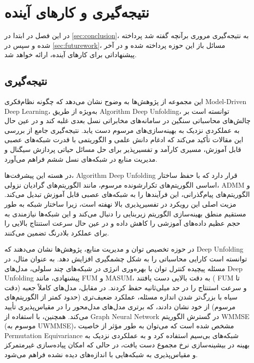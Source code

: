 \chapter{نتیجه‌گیری و کا‌ر‌های آینده}
\label{chap:conclusion}


در این فصل در ابتدا در 
\autoref{sec:conclusion}،
به نتیجه‌گیری مروری برآنچه گفته شد پرداخته شده و سپس در
\autoref{sec:futurework}،
مسائل باز این حوزه پرداخته شده و در آخر پیشنهاداتی برای کارهای آینده، ارائه خواهد شد. 

\section{نتیجه‌گیری}
\label{sec:conclusion}
این مجموعه از پژوهش‌ها به وضوح نشان می‌دهد که چگونه نظام‌فکری 
\gls{Model-Driven Deep Learning}،
به‌ویژه از طریق 
\gls{Algorithm Deep Unfolding}،
 توانسته است بر چالش‌های محاسباتی سنگین در سامانه‌های مخابراتی نسل بعدی غلبه کند و در عین حال به عملکردی نزدیک به بهینه‌سازی‌های مرسوم دست یابد. نتیجه‌گیری جامع از بررسی این مقالات تأکید می‌کند که ادغام دانش علمی و الگوریتمی با قدرت شبکه‌های عصبی قابل آموزش، مسیری کارآمد و تفسیرپذیر برای حل مسائل حیاتی پردازش سیگنال و مدیریت منابع در شبکه‌های نسل ششم فراهم می‌آورد.

در هسته این پیشرفت‌ها، 
\gls{Algorithm Deep Unfolding}
قرار دارد که با حفظ ساختار اساسی الگوریتم‌های تکرارشونده مرسوم، مانند الگوریتم‌های گرادیان نزولی،
\gls{ADMM}
 و الگوریتم‌های پیام‌گذرانی، این فرآیندها را به شبکه‌های عصبی قابل آموزش تبدیل می‌کند. مزیت اصلی این رویکرد در تفسیرپذیری بالا نهفته است، زیرا ساختار شبکه به طور مستقیم منطق بهینه‌سازی الگوریتم زیربنایی را دنبال می‌کند و این شبکه‌ها نیازمندی به حجم عظیم داده‌های آموزشی را کاهش داده و در عین حال سرعت استنتاج بالایی را برای عملکرد بلادرنگ تضمین می‌کنند.

در حوزه تخصیص توان و مدیریت منابع، پژوهش‌ها نشان می‌دهند که 
\gls{Deep Unfolding}
 توانسته است کارایی محاسباتی را به شکل چشمگیری افزایش دهد. به عنوان مثال، در مسئله پیچیده کنترل توان با بهره‌وری انرژی در شبکه‌های چند سلولی، مدل‌های
\gls{Deep Unfolding}
  پیشنهادی، مانند 
\gls{FUM}
  و 
\gls{MASUM}،
   به دقت بالایی دست یافتند (
\gls{FUM}
    تا 
   دقت) و سرعت استنتاج را در حد میلی‌ثانیه حفظ کردند. در مقابل، مدل‌های کاملاً جعبه سیاه با بزرگ‌تر شدن اندازه مسئله، عملکرد ضعیف‌تری (حدود
 کمتر از الگوریتم‌های مرسوم) از خود نشان دادند، که برتری مدل‌های مدل‌محور را در مقیاس‌پذیری تأیید می‌کند. همچنین، با استفاده از 
\gls{Graph Neural Network}
 در گسترش الگوریتم 
\gls{WMMSE}
  (موسوم به 
\gls{UWMMSE})،
 مشخص شده است که می‌توان به طور مؤثر از خاصیت
\gls{Permutation Equivariance}
    شبکه‌های بی‌سیم استفاده کرد و به عملکردی نزدیک به بهینه در بیشینه‌سازی نرخ مجموع دست یافت، در حالی که امکان پیاده‌سازی غیرمتمرکز و مقیاس‌پذیری به شبکه‌هایی با اندازه‌های دیده نشده فراهم می‌شود.

